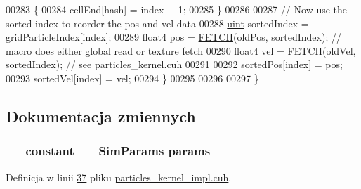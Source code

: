 \begin{DoxyCode}
00283         \{
00284             cellEnd[hash] = index + 1;
00285         \}
00286 
00287         \textcolor{comment}{// Now use the sorted index to reorder the pos and vel data}
00288         \hyperlink{particles__kernel_8cuh_a91ad9478d81a7aaf2593e8d9c3d06a14}{uint} sortedIndex = gridParticleIndex[index];
00289         float4 pos = \hyperlink{particles__kernel_8cuh_a12269d678a65f18889c2a7e98c756457}{FETCH}(oldPos, sortedIndex);       \textcolor{comment}{// macro does either global read or texture
       fetch}
00290         float4 vel = \hyperlink{particles__kernel_8cuh_a12269d678a65f18889c2a7e98c756457}{FETCH}(oldVel, sortedIndex);       \textcolor{comment}{// see particles\_kernel.cuh}
00291 
00292         sortedPos[index] = pos;
00293         sortedVel[index] = vel;
00294     \}
00295 
00296 
00297 \}
\end{DoxyCode}


\subsection{Dokumentacja zmiennych}
\hypertarget{particles__kernel__impl_8cuh_a8db8938e28edd17862daf58651051bdc}{
\subsubsection[{params}]{\setlength{\rightskip}{0pt plus 5cm}\-\_\-\-\_\-constant\-\_\-\-\_\- {\bf Sim\-Params} params}}\label{particles__kernel__impl_8cuh_a8db8938e28edd17862daf58651051bdc}


Definicja w linii \hyperlink{particles__kernel__impl_8cuh_source_l00037}{37} pliku \hyperlink{particles__kernel__impl_8cuh_source}{particles\-\_\-kernel\-\_\-impl.\-cuh}.

